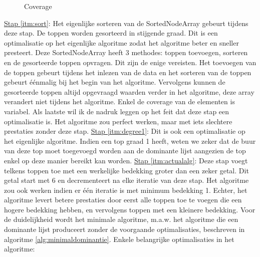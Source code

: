 \documentclass[11pt, a4paper, table]{article}
\theoremstyle{definition}
\begin{document}
\begin{figure}
	\centering
	\label{fig:example_coverage}
	\caption{Coverage}
\end{figure}
\newline\underline{Stap \ref{itm:sort}}: Het eigenlijke sorteren van de SortedNodeArray gebeurt tijdens deze stap. De toppen worden gesorteerd in stijgende graad. Dit is een optimalisatie op het eigenlijke algoritme zodat het algoritme beter en sneller presteert. Deze SortedNodeArray heeft 3 methodes: toppen toevoegen, sorteren en de gesorteerde toppen opvragen. Dit zijn de enige vereisten. Het toevoegen van de toppen gebeurt tijdens het inlezen van de data en het sorteren van de toppen gebeurt \'{e}\'{e}nmalig bij het begin van het algoritme. Vervolgens kunnen de gesorteerde toppen altijd opgevraagd waarden verder in het algoritme, deze array verandert niet tijdens het algoritme. Enkel de coverage van de elementen is variabel. Als laatste wil ik de nadruk leggen op het feit dat deze stap een optimalisatie is. Het algoritme zou perfect werken, maar met iets slechtere prestaties zonder deze stap.
\newline\underline{Stap \ref{itm:degree1}}: Dit is ook een optimalisatie op het eigenlijke algoritme. Indien een top graad 1 heeft, weten we zeker dat de buur van deze top moet toegevoegd worden aan de dominante lijst aangezien de top enkel op deze manier bereikt kan worden. 
\newline\underline{Stap \ref{itm:actualalg}}: Deze stap voegt telkens toppen toe met een werkelijke bedekking groter dan een zeker getal. Dit getal start met 6 en decrementeert na elke iteratie van deze stap. Het algoritme zou ook werken indien er \'{e}\'{e}n iteratie is met minimum bedekking 1. Echter, het algoritme levert betere prestaties door eerst alle toppen toe te voegen die een hogere bedekking hebben, en vervolgens toppen met een kleinere bedekking.  Voor de duidelijkheid wordt het minimale algoritme, m.a.w. het algoritme die een dominante lijst produceert zonder de voorgaande optimalisaties, beschreven in algoritme \ref{alg:minimaldominantie}. Enkele belangrijke optimalisaties in het algoritme: 
\end{document}
